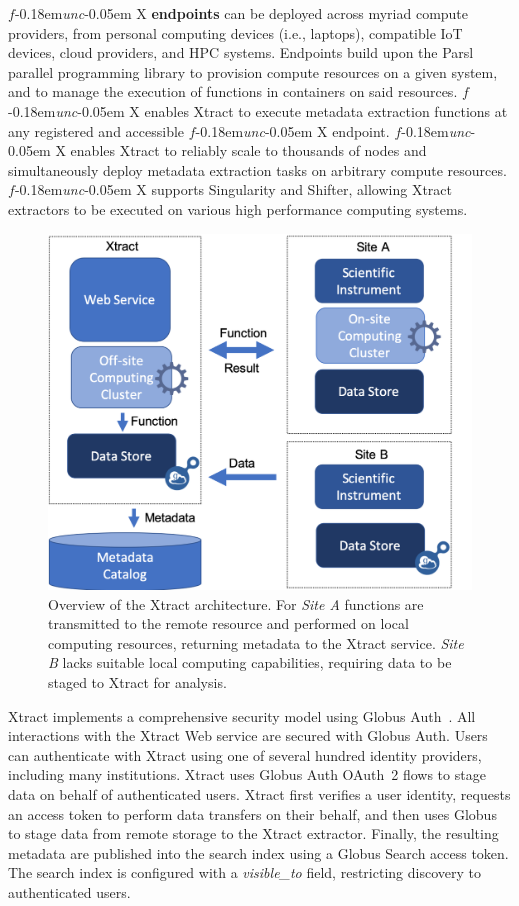 \documentclass[sigconf, 9pt]{acmart}
\newcommand{\name}{Xtract}
\newcommand{\funcx}{$f$\kern-0.18em\emph{unc}\kern-0.05em X}
\begin{document}
\funcx{} \textbf{endpoints} can be deployed across myriad compute providers, from personal computing devices (i.e., laptops), compatible 
IoT devices, cloud providers, and HPC systems.  Endpoints build upon the Parsl~\cite{babuji2019parsl} parallel programming library to 
provision compute resources on a given system, and to manage the execution of functions in containers on said resources. \funcx{} enables 
\name{} to execute metadata extraction functions at any registered and accessible \funcx{} endpoint.  \funcx{} enables \name{} to reliably 
scale to thousands of nodes and simultaneously deploy metadata extraction tasks on arbitrary compute resources. 
\funcx{} supports Singularity and Shifter, allowing \name{} extractors to be executed
on various high performance computing systems. 


\begin{figure}[t]
	\centering
	\includegraphics[scale=0.3]{figs/new-arch.png}
	\caption{Overview of the \name{} architecture. For \textit{Site A} functions are transmitted to the remote resource and performed on local computing resources, returning metadata to the \name{} service. \textit{Site B} lacks suitable local
	computing capabilities, requiring data to be staged to \name{} for analysis.}
	\label{fig:arch}
\end{figure}


\name{} implements a comprehensive security model using Globus Auth~\cite{tuecke2016globus}. 
All interactions with the \name{} Web service are secured with Globus Auth. 
Users can authenticate with \name{} using one of 
several hundred identity providers, including many institutions. 
\name{} uses Globus Auth OAuth~2 flows to stage data on behalf
of authenticated users. \name{} first verifies a user identity, requests an access
token to perform data transfers on their behalf, and then uses Globus to stage
data from remote storage to the \name{} extractor. 
Finally, the resulting metadata are published into the search index using a Globus Search
access token. The search index is configured with a \textit{visible\_to} field, restricting
discovery to authenticated users.
\end{document}
